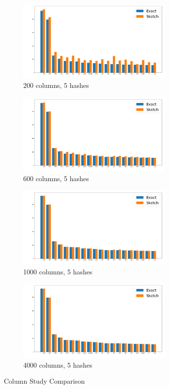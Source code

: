 \documentclass[shortpaper]{revdetua}
\begin{document}
\begin{figure}[ht]
    \onecolumn
    \begin{subfigure}[t]{0.5\textwidth}
        \includegraphics[height=1.6in]{englishAlice200_5.png}
        \caption{200 columns, 5 hashes} 
    \end{subfigure}
    \begin{subfigure}[t]{0.5\textwidth}
        \includegraphics[height=1.6in]{englishAlice600_5.png}
        \caption{600 columns, 5 hashes}
    \end{subfigure}
    \begin{subfigure}[t]{0.5\textwidth}
        \includegraphics[height=1.6in]{englishAlice1000_5.png}
        \caption{1000 columns, 5 hashes}
    \end{subfigure}
    \begin{subfigure}[t]{0.5\textwidth}
        \includegraphics[height=1.6in]{englishAlice4000_5.png}
        \caption{4000 columns, 5 hashes}
    \end{subfigure}
    \caption{Column Study Comparison}
    \label{fig:columnSketchComp}
\end{figure}
\end{document}
